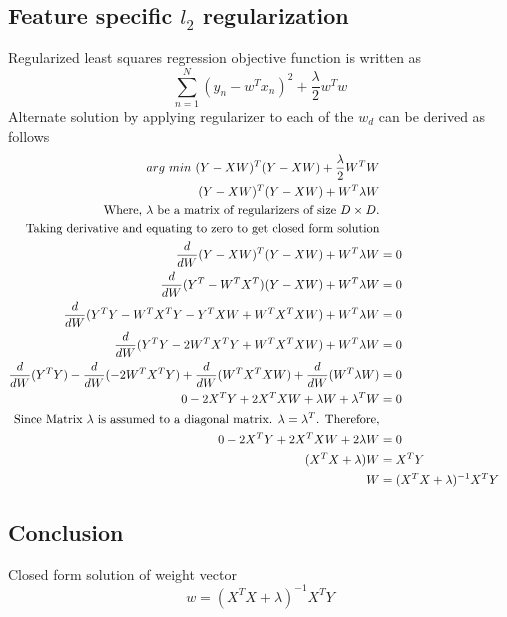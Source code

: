 \documentclass[a4paper,11pt]{article}
\newcommand\tab[1][1cm]{\hspace*{#1}}
\begin{document}
\begin{mlsolution}

\section*{Feature specific $l_2$ regularization}
\noindent
\tab Regularized least squares regression objective function is written as
$$
\sum\limits_{n=1}^{N}(y_n-w^Tx_n)^2 + \frac{\lambda}{2}w^Tw
$$
\noindent
\tab Alternate solution by applying regularizer to each of the $w_d$ can be derived as follows\\
\noindent
\tab 
\begin{align*}
arg\ min\ (Y-XW)^T(Y-XW) + \frac{\lambda}{2}W^TW\\
(Y-XW)^T(Y-XW) + W^T \lambda W \\
\textnormal{Where, $\lambda$ be a matrix of regularizers of size $D \times D$.}\\
\textnormal{Taking derivative and equating to zero to get closed form solution}\\
\frac{d }{dW}(Y-XW)^T(Y-XW) + W^T \lambda W &= 0\\
\frac{d }{dW}(Y^T-W^TX^T)(Y-XW) + W^T \lambda W &= 0\\
\frac{d }{dW}(Y^TY-W^TX^TY-Y^TXW+W^TX^TXW) + W^T \lambda W &= 0\\
\frac{d }{dW}(Y^TY-2W^TX^TY+W^TX^TXW) + W^T \lambda W &= 0\\
\frac{d }{dW}(Y^TY) - \frac{d }{dW}(-2W^TX^TY)+\frac{d }{dW}(W^TX^TXW) + \frac{d }{dW}(W^T \lambda W) &= 0\\
0 - 2X^TY + 2X^TXW + \lambda W +\lambda ^T W&= 0\\
\textnormal{Since Matrix $\lambda$ is assumed to a diagonal matrix. $\lambda = \lambda^T$. Therefore,}\\
0 - 2X^TY + 2X^TXW + 2\lambda W &= 0\\
(X^TX + \lambda) W &= X^TY\\
 W &= (X^TX + \lambda)^{-1}X^TY\\
\end{align*}
\subsection*{Conclusion}
\tab Closed form solution of weight vector 
$$
w = (X^TX + \lambda)^{-1}X^TY
$$
\end{mlsolution}
	
\end{document}
